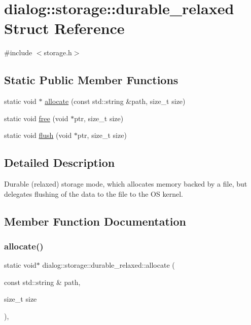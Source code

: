 \hypertarget{structdialog_1_1storage_1_1durable__relaxed}{}\section{dialog\+:\+:storage\+:\+:durable\+\_\+relaxed Struct Reference}
\label{structdialog_1_1storage_1_1durable__relaxed}


{\ttfamily \#include $<$storage.\+h$>$}

\subsection*{Static Public Member Functions}
\begin{DoxyCompactItemize}
\item 
static void $\ast$ \hyperlink{structdialog_1_1storage_1_1durable__relaxed_a1067618bb9a7eae15a84642affcfcdd1}{allocate} (const std\+::string \&path, size\+\_\+t size)
\item 
static void \hyperlink{structdialog_1_1storage_1_1durable__relaxed_a7eee32ffcf5bd7a8da913f3cc5747579}{free} (void $\ast$ptr, size\+\_\+t size)
\item 
static void \hyperlink{structdialog_1_1storage_1_1durable__relaxed_a017593d30af37c9bb6df31c82dfbfcf5}{flush} (void $\ast$ptr, size\+\_\+t size)
\end{DoxyCompactItemize}


\subsection{Detailed Description}
Durable (relaxed) storage mode, which allocates memory backed by a file, but delegates flushing of the data to the file to the OS kernel. 

\subsection{Member Function Documentation}
\mbox{\label{structdialog_1_1storage_1_1durable__relaxed_a1067618bb9a7eae15a84642affcfcdd1}} 
\subsubsection{\texorpdfstring{allocate()}{allocate()}}
{\footnotesize\ttfamily static void$\ast$ dialog\+::storage\+::durable\+\_\+relaxed\+::allocate (\begin{DoxyParamCaption}\item[{const std\+::string \&}]{path,  }\item[{size\+\_\+t}]{size }\end{DoxyParamCaption})\hspace{0.3cm}{\ttfamily [inline]}, {\ttfamily [static]}}

